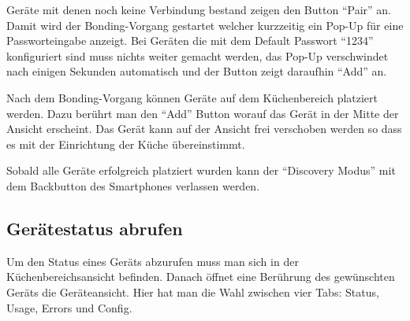 Geräte mit denen noch keine Verbindung bestand zeigen den Button \enquote{Pair} an. Damit wird der Bonding-Vorgang gestartet welcher kurzzeitig ein Pop-Up für eine Passworteingabe anzeigt. Bei Geräten die mit dem Default Passwort \enquote{1234} konfiguriert sind muss nichts weiter gemacht werden, das Pop-Up verschwindet nach einigen Sekunden automatisch und der Button zeigt daraufhin \enquote{Add} an.

Nach dem Bonding-Vorgang können Geräte auf dem Küchenbereich platziert werden. Dazu berührt man den \enquote{Add} Button worauf das Gerät in der Mitte der Ansicht erscheint. Das Gerät kann auf der Ansicht frei verschoben werden so dass es mit der Einrichtung der Küche übereinstimmt. 

Sobald alle Geräte erfolgreich platziert wurden kann der \enquote{Discovery Modus} mit dem Backbutton des Smartphones verlassen werden.

\WFclear
\subsection{Gerätestatus abrufen}
Um den Status eines Geräts abzurufen muss man sich in der Küchenbereichsansicht befinden. Danach öffnet eine Berührung des gewünschten Geräts die Geräteansicht. Hier hat man die Wahl zwischen vier Tabs: Status, Usage, Errors und Config.

